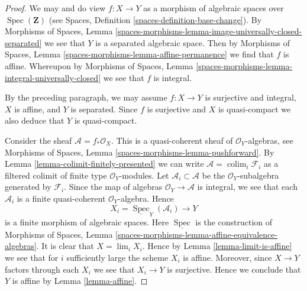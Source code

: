 \documentclass{stacks-project}
\theoremstyle{plain}
\theoremstyle{definition}
\theoremstyle{remark}
\numberwithin{equation}{subsection}
\def\lim{\mathop{\mathrm{lim}}\nolimits}
\def\colim{\mathop{\mathrm{colim}}\nolimits}
\def\Spec{\mathop{\mathrm{Spec}}}
\begin{document}
\begin{proof}
We may and do view $f : X \to Y$ as a morphism of algebraic spaces over
$\Spec(\mathbf{Z})$ (see
Spaces, Definition \ref{spaces-definition-base-change}).
By Morphisms of Spaces, Lemma
\ref{spaces-morphisms-lemma-image-universally-closed-separated}
we see that $Y$ is a separated algebraic space. Then by
Morphisms of Spaces, Lemma \ref{spaces-morphisms-lemma-affine-permanence}
we find that $f$ is affine. Whereupon by
Morphisms of Spaces, Lemma
\ref{spaces-morphisms-lemma-integral-universally-closed}
we see that $f$ is integral.

\medskip\noindent
By the preceding paragraph, we may assume $f : X \to Y$
is surjective and integral, $X$ is affine, and $Y$ is separated.
Since $f$ is surjective and $X$ is quasi-compact we also deduce that $Y$ is
quasi-compact.

\medskip\noindent
Consider the sheaf $\mathcal{A} = f_*\mathcal{O}_X$.
This is a quasi-coherent sheaf of $\mathcal{O}_Y$-algebras, see
Morphisms of Spaces, Lemma \ref{spaces-morphisms-lemma-pushforward}.
By Lemma \ref{lemma-colimit-finitely-presented}
we can write $\mathcal{A} = \colim_i \mathcal{F}_i$ as a filtered
colimit of finite type $\mathcal{O}_Y$-modules. Let
$\mathcal{A}_i \subset \mathcal{A}$ be the $\mathcal{O}_Y$-subalgebra
generated by $\mathcal{F}_i$. Since the map of algebras
$\mathcal{O}_Y \to \mathcal{A}$ is integral, we see that each $\mathcal{A}_i$
is a finite quasi-coherent $\mathcal{O}_Y$-algebra. Hence
$$
X_i = \underline{\Spec}_Y(\mathcal{A}_i) \longrightarrow Y
$$
is a finite morphism of algebraic spaces. Here 
$\underline{\Spec}$ is the construction of Morphisms of Spaces, Lemma
\ref{spaces-morphisms-lemma-affine-equivalence-algebras}.
It is clear
that $X = \lim_i X_i$. Hence by
Lemma \ref{lemma-limit-is-affine}
we see that for $i$ sufficiently large the scheme $X_i$ is affine.
Moreover, since $X \to Y$ factors through each $X_i$ we see that
$X_i \to Y$ is surjective. Hence we conclude that $Y$ is affine by
Lemma \ref{lemma-affine}.
\end{proof}
\end{document}
